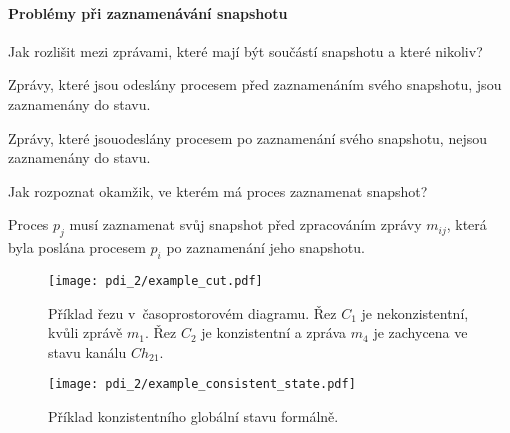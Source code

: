 \paragraph*{Problémy při zaznamenávání snapshotu} Jak rozlišit mezi zprávami, které mají být součástí snapshotu a které nikoliv?
\begin{compactitem}
    \item Zprávy, které jsou odeslány procesem před zaznamenáním svého  snapshotu, jsou zaznamenány do stavu.
    \item Zprávy, které jsouodeslány procesem po zaznamenání svého  snapshotu, nejsou zaznamenány do stavu.
\end{compactitem}

\noindent Jak rozpoznat okamžik, ve kterém má proces zaznamenat snapshot?
\begin{compactitem}
    \item Proces $p_j$ musí zaznamenat svůj snapshot před zpracováním zprávy $m_{ij}$, která byla poslána procesem $p_i$ po zaznamenání jeho snapshotu.
\end{compactitem}

\begin{figure}[H]
    \centering
    \texttt{[image: pdi\_2/example\_cut.pdf]}
    \caption{Příklad řezu v~časoprostorovém diagramu. Řez $C_1$ je nekonzistentní, kvůli zprávě $m_1$. Řez $C_2$ je konzistentní a zpráva $m_4$ je zachycena ve stavu kanálu $Ch_{21}$.}
    \label{48_example_cut}
\end{figure}


\begin{figure}[H]
    \centering
    \texttt{[image: pdi\_2/example\_consistent\_state.pdf]}
    \caption{Příklad konzistentního globální stavu formálně.}
    \label{48_example_consistent_state}
\end{figure}
